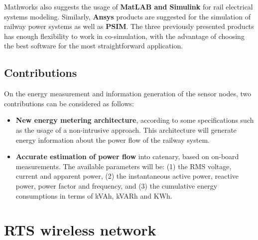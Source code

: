 Mathworks also suggests the usage of \textbf{MatLAB and Simulink} for rail electrical systems modeling. 
Similarly, \textbf{Ansys} products are suggested for the simulation of railway power systems as well as \textbf{PSIM}. The three previously presented products has enough flexibility to work in co-simulation, with the advantage of choosing the best software for the most straightforward application.


	\subsection{Contributions}
	
	On the energy measurement and information generation of the sensor nodes, two contributions can be considered as follows:
	
	\begin{itemize}
		\setlength\itemsep{0em}
		
		\item \textbf{New energy metering architecture}, according to some specifications such as the usage of a non-intrusive approach.
		This architecture will generate energy information about the power flow of the railway system.
		
		\item \textbf{Accurate estimation of power flow} into catenary, based on on-board measurements. The available parameters will be: (1) the RMS voltage, current and apparent power, (2) the instantaneous active power, reactive power, power factor and frequency, and (3) the cumulative energy consumptions in terms of kVAh, kVARh and KWh.
		
		
	\end{itemize}

%		
%		
	

\section{\ac{RTS} wireless network}
\label{sec:43}

